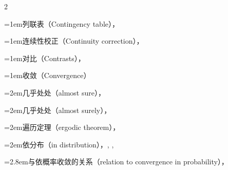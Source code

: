 \begin{multicols}{2}
\par\addvspace{2pt}
\par\noindent\hangindent=1em\hspace*{0em}\label{idx:197}列联表（Contingency table），\hyperref[exercise:10.31]{\pageref*{exercise:10.31}}\par
\par\addvspace{2pt}
\par\noindent\hangindent=1em\hspace*{0em}\label{idx:198}连续性校正（Continuity correction），\hyperref[ex:3.3.2]{\pageref*{ex:3.3.2}}\par
\par\addvspace{2pt}
\par\noindent\hangindent=1em\hspace*{0em}\label{idx:199}对比（Contrasts），\hyperref[def:11.2.4]{\pageref*{def:11.2.4}}\par
\par\addvspace{2pt}
\par\noindent\hangindent=1em\hspace*{0em}\label{idx:200}收敛（Convergence）\par
\par\noindent\hangindent=2em\hspace*{1em}\label{idx:201}几乎处处（almost sure），\hyperref[def:5.5.6]{\pageref*{def:5.5.6}}\par
\par\noindent\hangindent=2em\hspace*{1em}\label{idx:202}几乎处处（almost surely），\hyperref[sec:5.8.4]{\pageref*{sec:5.8.4}}\par
\par\noindent\hangindent=2em\hspace*{1em}\label{idx:203}遍历定理（ergodic theorem），\hyperref[idxocc:203:250]{\pageref*{idxocc:203:250}}\par
\par\noindent\hangindent=2em\hspace*{1em}\label{idx:204}依分布（in distribution），\hyperref[def:5.5.10]{\pageref*{def:5.5.10}}, \hyperref[thm:5.5.17]{\pageref*{thm:5.5.17}}, \hyperref[sec:10.3.2]{\pageref*{sec:10.3.2}}\par
\par\noindent\hangindent=2.8em\hspace*{1.8em}\label{idx:205}与依概率收敛的关系（relation to convergence in probability），\hyperref[thm:5.5.12]{\pageref*{thm:5.5.12}}\par

\end{multicols}
